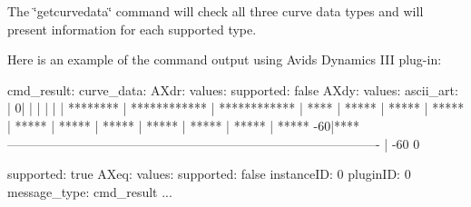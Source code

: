  The \char`\"{}getcurvedata\char`\"{} command will check all three curve data types and will present information for each supported type.

 Here is an example of the command output using Avid\textquotesingle{}s Dynamics I\+I\+I plug-\/in\+: \begin{DoxyVerb}cmd_result:
  curve_data:
	AXdr:
	  values:
		supported: false
	AXdy:
	  values:
		ascii_art: |
				0|                                                                                
				 |                                                                                
				 |                                                                                
				 |                                                                                
				 |                                                                                
				 |                                                                        ********
				 |                                                            ************        
				 |                                                ************                    
				 |                                            ****                                
				 |                                       *****                                    
				 |                                   *****                                        
				 |                               *****                                            
				 |                           *****                                                
				 |                       *****                                                    
				 |                   *****                                                        
				 |               *****                                                            
				 |           *****                                                                
				 |       *****                                                                    
				 |   *****                                                                        
			  -60|****                                                                            
		  ----------------------------------------------------------------------------------------
				 | -60                                                                           0
	  
		supported: true
	AXeq:
	  values:
		supported: false
  instanceID: 0
  pluginID: 0
message_type: cmd_result
...\end{DoxyVerb}
 

